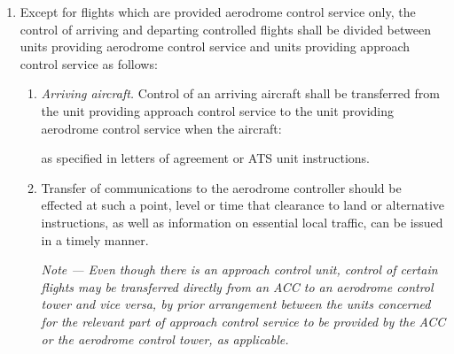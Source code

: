 \documentclass[../main.tex]{subfiles}
\begin{document}
    \begin{enumerate}
        \item Except for flights which are provided aerodrome control service only, the control of arriving and departing controlled flights shall be divided between units providing aerodrome control service and units providing approach control service as follows:
        
        \begin{enumerate}
            \item \textit{Arriving aircraft.} Control of an arriving aircraft shall be transferred from the unit providing approach control service to the unit providing aerodrome control service when the aircraft:
            
            
            \noindent as specified in letters of agreement or ATS unit instructions.
            
            \item \label{4.3.2.1.2} Transfer of communications to the aerodrome controller should be effected at such a point, level or time that clearance to land or alternative instructions, as well as information on essential local traffic, can be issued in a timely manner. \par
            \textit{Note --- Even though there is an approach control unit, control of certain flights may be transferred directly from an ACC to an aerodrome control tower and vice versa, by prior arrangement between the units concerned for the relevant part of approach control service to be provided by the ACC or the aerodrome control tower, as applicable.} 
            

\end{enumerate}
\end{enumerate}
\end{document}
